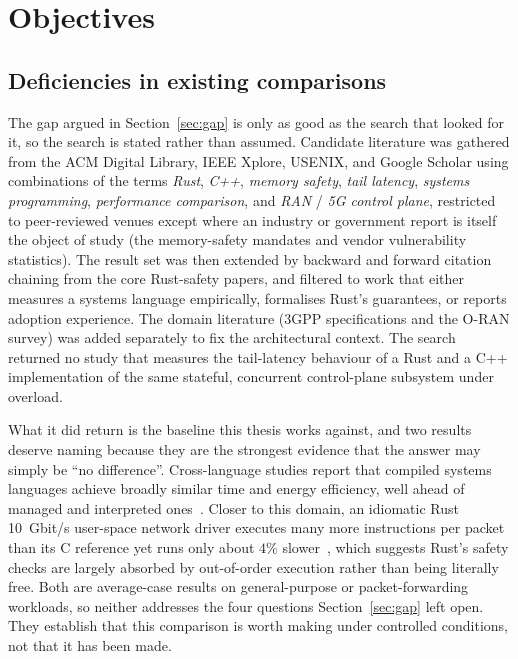 \documentclass[english,twoside,openright,a4paper,censored,csm,software-track-2020]{HYthesisML}
\begin{document}
\chapter{Objectives\label{chapter:objectives}}

\section{Deficiencies in existing comparisons}
The gap argued in Section~\ref{sec:gap} is only as good as the search that looked for it, so
the search is stated rather than assumed. Candidate literature was gathered from the ACM Digital
Library, IEEE Xplore, USENIX, and Google Scholar using combinations of the terms \emph{Rust},
\emph{C++}, \emph{memory safety}, \emph{tail latency}, \emph{systems programming},
\emph{performance comparison}, and \emph{RAN} / \emph{5G control plane}, restricted to
peer-reviewed venues except where an industry or government report is itself the object of
study (the memory-safety mandates and vendor vulnerability statistics). The result set was then
extended by backward and forward citation chaining from the core Rust-safety papers, and
filtered to work that either measures a systems language empirically, formalises Rust's
guarantees, or reports adoption experience. The domain literature (3GPP specifications and the
O-RAN survey) was added separately to fix the architectural context. The search returned no
study that measures the tail-latency behaviour of a Rust and a C++ implementation of the same
stateful, concurrent control-plane subsystem under overload.

What it did return is the baseline this thesis works against, and two results deserve naming
because they are the strongest evidence that the answer may simply be ``no difference''.
Cross-language studies report that compiled systems languages achieve broadly similar time and
energy efficiency, well ahead of managed and interpreted ones~\cite{pereira2017energy}. Closer
to this domain, an idiomatic Rust 10~Gbit/s user-space network driver executes many more
instructions per packet than its C reference yet runs only about $4\%$
slower~\cite{emmerich2019drivers}, which suggests Rust's safety checks are largely absorbed by
out-of-order execution rather than being literally free. Both are average-case results on
general-purpose or packet-forwarding workloads, so neither addresses the four questions
Section~\ref{sec:gap} left open. They establish that this comparison is worth making under
controlled conditions, not that it has been made.
\end{document}
